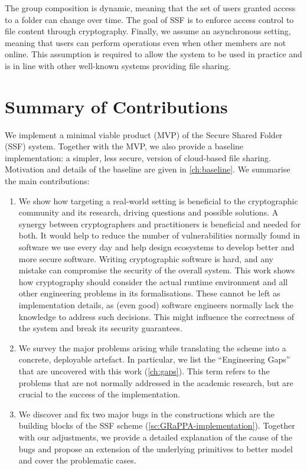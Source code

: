 The group composition is dynamic, meaning that the set of users granted access to a folder can change over time.
The goal of SSF is to enforce access control to file content through cryptography.
Finally, we assume an asynchronous setting, meaning that users can
perform operations even when other members are not online.
This assumption is required to allow the system to be used in practice
and is in line with other well-known systems providing file sharing.

\section{Summary of Contributions}\label{sc:summary-of-contributions}

We implement a minimal viable product (MVP) of the Secure Shared Folder (SSF) system.
Together with the MVP, we also provide a baseline implementation:
a simpler, less secure, version of cloud-based file sharing. Motivation
and details of the baseline are given in \cref{ch:baseline}.
We summarise the main contributions:

\begin{enumerate}
    \item We show how targeting a real-world setting is 
    beneficial to the cryptographic community and its 
    research, driving questions and possible solutions. 
    A synergy between cryptographers and practitioners 
    is beneficial and needed for both. It would help to 
    reduce the number of vulnerabilities normally found 
    in software we use every day and help design ecosystems 
    to develop better and more secure software. 
    Writing cryptographic software is hard, 
    and any mistake can compromise the security of the overall 
    system. This work shows how cryptography 
    should consider the actual runtime environment 
    and all other engineering problems in its formalisations. 
    These cannot be left as implementation details, 
    as (even good) software engineers normally lack the 
    knowledge to address such decisions. This might influence 
    the correctness of the system and break its security guarantees.
    \item We survey the major problems arising while 
    translating the scheme into a concrete, deployable 
    artefact. In particular, we list the ``Engineering Gaps''
    that are uncovered with this work (\cref{ch:gaps}). 
    This term refers to 
    the problems that are not normally addressed in the 
    academic research, but are crucial to the success of 
    the implementation.
    \item We discover and fix two major bugs in the 
    constructions which are the building blocks of 
    the SSF scheme (\cref{sc:GRaPPA-implementation}). 
    Together with our adjustments, we provide a 
    detailed explanation of the cause of the bugs and 
    propose an extension of the underlying primitives to 
    better model and cover the problematic cases.
\end{enumerate}

